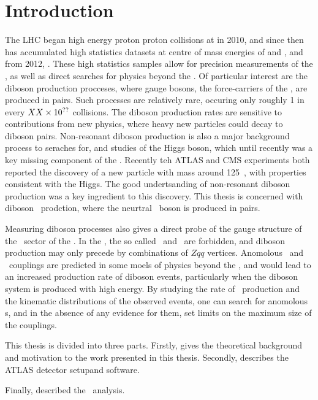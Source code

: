 \graphicspath{{Chapters/Introduction/Figures/}}

\chapter*{Introduction}
\label{chap:Introduction}

The LHC began high energy proton proton collisions at in 2010, and since then
has accumulated high statistics datasets at centre of mass energies of
and  , and from 2012, . These high statistics samples
allow for precision measurements of the \sm, as well as direct searches for
physics beyond the \sm. Of particular interest are the diboson production
procceses, where gauge bosons, the force-carriers of the \sm, are produced in
pairs. Such processes are relatively rare, occuring only roughly 1 in every
$XX\times 10 ^{??}$ collisions. The diboson production rates are sensitive to
contributions from new physics, where heavy new particles could decay to diboson
pairs. Non-resonant diboson production is also a major background process to
seraches for, and studies of the Higgs boson, which until recently was a key
missing component of the \sm. Recently teh ATLAS and CMS experiments both
reported the discovery of a new particle with mass around 125~\gev, with
properties consistent with the Higgs. The good undertsanding of non-resonant
diboson production was a key ingredient to this discovery. This thesis is
concerned with diboson \ZZ\ prodction, where the neurtral \Z\ boson is produced
in pairs.

Measuring diboson processes also gives a direct probe of the gauge structure of
the \ew\ sector of the \sm. In the \sm, the so called  \ZZZ\ and \ZZg\ are forbidden, and diboson production may
only precede by combinations of $Zqq$ vertices. Anomolous \ZZZ\ and \ZZg\ couplings are
predicted in some moels of physics beyond the \sm, and would lead to an
increased production rate of diboson events, particularly when the diboson
system is produced with high energy. By studying the rate of \ZZ\ production and
the kinematic distributions of the observed events, one can search for anomolous
\TGC s, and in the absence of any evidence for them, set limits on the maximum
size of the couplings.

This thesis is divided into three parts. Firstly,  gives the theoretical background
and motivation to the work presented in this thesis.
Secondly,  describes the ATLAS detector setupand software.

Finally,  described the \ZZ\ analysis.

